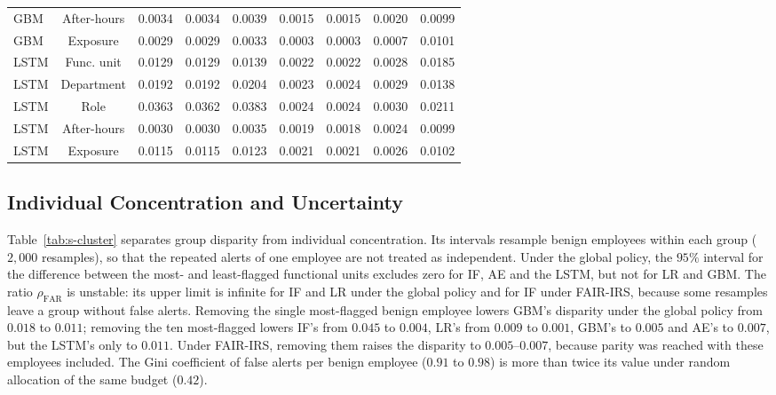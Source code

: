 \documentclass[10pt,onecolumn,letterpaper]{article}
\newcommand{\FAR}{\mathrm{FAR}}
\begin{document}
\begin{table}[!t]
{\begin{tabular}{lcccccccc}
GBM & After-hours & 0.0034 & 0.0034 & 0.0039 & 0.0015 & 0.0015 & 0.0020 & 0.0099 \\
GBM & Exposure & 0.0029 & 0.0029 & 0.0033 & 0.0003 & 0.0003 & 0.0007 & 0.0101 \\
LSTM & Func. unit & 0.0129 & 0.0129 & 0.0139 & 0.0022 & 0.0022 & 0.0028 & 0.0185 \\
LSTM & Department & 0.0192 & 0.0192 & 0.0204 & 0.0023 & 0.0024 & 0.0029 & 0.0138 \\
LSTM & Role & 0.0363 & 0.0362 & 0.0383 & 0.0024 & 0.0024 & 0.0030 & 0.0211 \\
LSTM & After-hours & 0.0030 & 0.0030 & 0.0035 & 0.0019 & 0.0018 & 0.0024 & 0.0099 \\
LSTM & Exposure & 0.0115 & 0.0115 & 0.0123 & 0.0021 & 0.0021 & 0.0026 & 0.0102 \\
\bottomrule
\end{tabular}}
\end{table}

\subsection{Individual Concentration and Uncertainty}
Table~\ref{tab:s-cluster} separates group disparity from individual concentration. Its intervals resample benign employees within each group ($2{,}000$ resamples), so that the repeated alerts of one employee are not treated as independent. Under the global policy, the $95\%$ interval for the difference between the most- and least-flagged functional units excludes zero for IF, AE and the LSTM, but not for LR and GBM. The ratio $\rho_{\FAR}$ is unstable: its upper limit is infinite for IF and LR under the global policy and for IF under FAIR-IRS, because some resamples leave a group without false alerts. Removing the single most-flagged benign employee lowers GBM's disparity under the global policy from $0.018$ to $0.011$; removing the ten most-flagged lowers IF's from $0.045$ to $0.004$, LR's from $0.009$ to $0.001$, GBM's to $0.005$ and AE's to $0.007$, but the LSTM's only to $0.011$. Under FAIR-IRS, removing them raises the disparity to $0.005$--$0.007$, because parity was reached with these employees included. The Gini coefficient of false alerts per benign employee ($0.91$ to $0.98$) is more than twice its value under random allocation of the same budget ($0.42$).
\end{document}
